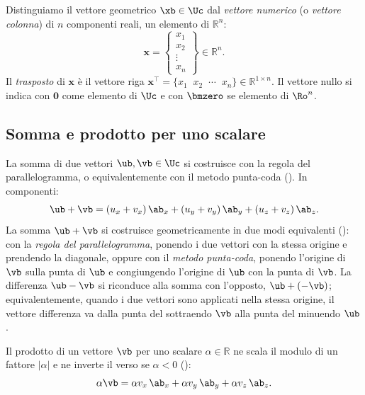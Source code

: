 Distinguiamo il vettore geometrico $\xb\in\Uc$ dal \textit{vettore numerico} (o \textit{vettore colonna}) di $n$ componenti reali, un elemento di $\mathbb{R}^n$:
\begin{equation}
	\bm{x} = \begin{Bmatrix} x_1 \\ x_2 \\ \vdots \\ x_n \end{Bmatrix} \in \mathbb{R}^{n}.
\end{equation}
Il \textit{trasposto} di $\bm{x}$ \`e il vettore riga $\bm{x}^\top = \{x_1 \;\; x_2 \;\; \cdots \;\; x_n\} \in \mathbb{R}^{1\times n}$. Il vettore nullo si indica con $\bm{0}$ come elemento di $\Uc$ e con
$\bmzero$ se elemento di $\Ro^n$.



\subsection{Somma e prodotto per uno scalare}

La somma di due vettori $\ub, \vb \in \Uc$ si costruisce con la regola
del parallelogramma, o equivalentemente con il metodo punta-coda
(). 
In componenti:
\begin{equation}
	\ub + \vb = (u_x+v_x)\,\ab_x + (u_y+v_y)\,\ab_y + (u_z+v_z)\,\ab_z.
\end{equation}
La somma $\ub + \vb$ si costruisce geometricamente in due modi	equivalenti (): con la \textit{regola del 	parallelogramma}, ponendo i due vettori con la stessa origine e	prendendo la diagonale, oppure con il \textit{metodo punta-coda}, ponendo l'origine di $\vb$ sulla punta di $\ub$ e congiungendo	l'origine di $\ub$ con la punta di $\vb$. La differenza $\ub - \vb$	si riconduce alla somma con l'opposto, $\ub + (-\vb)$; equivalentemente, quando i due vettori sono applicati nella stessa origine, il vettore	differenza va dalla punta del sottraendo $\vb$ alla punta del minuendo	$\ub$.







Il prodotto di un vettore $\vb$ per uno scalare $\alpha \in \mathbb{R}$
ne scala il modulo di un fattore $|\alpha|$ e ne inverte il verso se
$\alpha < 0$ ():
\begin{equation}
	\alpha\vb = \alpha v_x\,\ab_x + \alpha v_y\,\ab_y + \alpha v_z\,\ab_z.
\end{equation}
%

